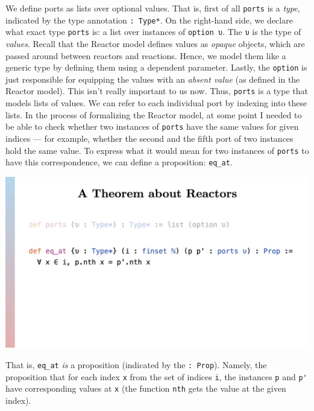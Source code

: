 \documentclass{article}
\begin{document}
We define ports as lists over optional values. That is, first of all
\lstinline{ports} is a \emph{type}, indicated by the type annotation
\lstinline{: Type*}. On the right-hand side, we declare what exact type
\lstinline{ports} is: a list over instances of \lstinline{option υ}. The
\lstinline{υ} is the type of \emph{values}. Recall that the Reactor model
defines values as \emph{opaque} objects, which are passed around between
reactors and reactions. Hence, we model them like a generic type by
defining them using a dependent parameter. Lastly, the \lstinline{option}
is just responsible for equipping the values with an \emph{absent value}
(as defined in the Reactor model). This isn't really important to us
now. Thus, \lstinline{ports} is a type that models lists of values. We can
refer to each individual port by indexing into these lists. In the
process of formalizing the Reactor model, at some point I needed to be
able to check whether two instances of \lstinline{ports} have the same
values for given indices --- for example, whether the second and the fifth
port of two instances hold the same value. To express what it would mean
for two instances of \lstinline{ports} to have this correspondence, we can
define a proposition: \lstinline{eq_at}.

\begin{center}
  \includegraphics[width=\columnwidth]{Slides/Slide 10.jpeg}
\end{center}

That is, \lstinline{eq_at} \emph{is} a proposition (indicated by the
\lstinline{: Prop}). Namely, the proposition that for each index
\lstinline{x} from the set of indices \lstinline{i}, the instances \lstinline{p}
and \lstinline{p'} have corresponding values at \lstinline{x}
(the function \lstinline{nth} gets the value at the given index).
\end{document}
